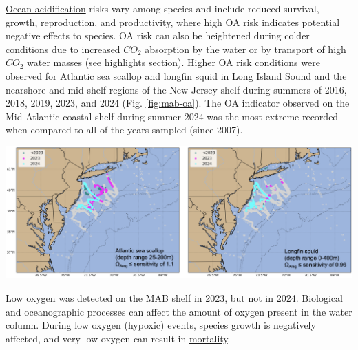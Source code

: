 \documentclass[
  10pt,
]{article}
\let\origfigure\figure
\let\endorigfigure\endfigure
\renewenvironment{figure}[1][2] {
    \expandafter\origfigure\expandafter[H]
} {
    \endorigfigure
}
\begin{document}
\href{https://noaa-edab.github.io/catalog/ocean_acidification.html}{Ocean acidification} risks vary among species and include reduced survival, growth, reproduction, and productivity, where high OA risk indicates potential negative effects to species. OA risk can also be heightened during colder conditions due to increased \(CO_2\) absorption by the water or by transport of high \(CO_2\) water masses (see \hyperref[highlights]{highlights section}). Higher OA risk conditions were observed for Atlantic sea scallop and longfin squid in Long Island Sound and the nearshore and mid shelf regions of the New Jersey shelf during summers of 2016, 2018, 2019, 2023, and 2024 (Fig. \ref{fig:mab-oa}). The OA indicator observed on the Mid-Atlantic coastal shelf during summer 2024 was the most extreme recorded when compared to all of the years sampled (since 2007).

\begin{figure}

{\centering \includegraphics[width=1\linewidth]{images/SOE-2025-OA-figure_final_GraceSaba_2025} 

}

\caption{Locations where bottom aragonite saturation state ($\Omega_{Arag}$; summer only: June-August) were at or below the laboratory-derived sensitivity level for Atlantic sea scallop (left panel) and longfin squid (right panel) for the time periods 2007-2022 (dark cyan), 2023 only (magenta) and 2024 only (cyan). Gray circles indicate locations where bottom $\Omega_{Arag}$ values were above the species specific sensitivity values..}\label{fig:mab-oa-1}
\end{figure}

Low oxygen was detected on the \href{https://noaa-edab.github.io/catalog/observation_synthesis_2023.html}{MAB shelf in 2023}, but not in 2024. Biological and oceanographic processes can affect the amount of oxygen present in the water column. During low oxygen (hypoxic) events, species growth is negatively affected, and very low oxygen can result in \href{https://sebsnjaesnews.rutgers.edu/2023/12/rutgers-scientists-observe-unusual-ocean-conditions-possibly-linked-to-mortality-in-marine-life-off-new-jersey/}{mortality}.
\end{document}
